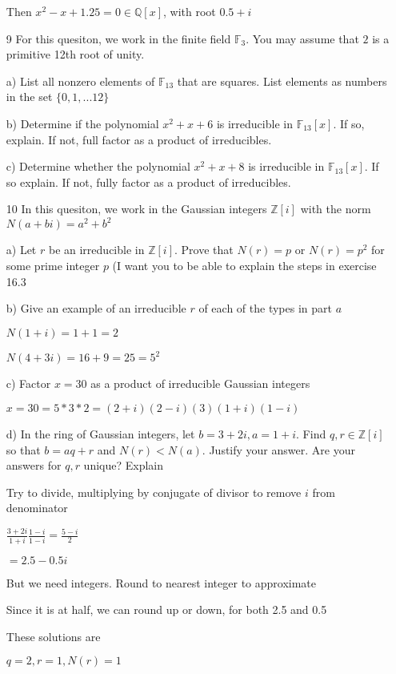 \documentclass[12pt]{article}
\begin{document}
\begin{itemize}
		Then $x^2 - x + 1.25 = 0 \in \mathbb{Q}[x]$, with root $0.5 + i$ 

	\item[9] For this quesiton, we work in the finite field $\mathbb{F}_{3}$. You may assume that $2$ is a primitive 12th root of unity.

		a) List all nonzero elements of $\mathbb{F}_{13}$ that are squares. List elements as numbers in the set $\{0,1,...12\}$

		b) Determine if the polynomial $x^2 + x + 6$ is irreducible in $\mathbb{F}_{13}[x]$. If so, explain. If not, full factor as a product of irreducibles.

		c) Determine whether the polynomial $x^2 + x + 8$ is irreducible in $\mathbb{F}_{13}[x]$. If so explain. If not, fully factor as a product of irreducibles.

	\item[10] In this quesiton, we work in the Gaussian integers $\mathbb{Z}[i]$  with the norm $N(a+bi) = a^2 + b^2$

		a) Let $r$ be an irreducible in $\mathbb{Z}[i]$. Prove that $N(r) = p$ or $N(r) = p^2$ for some prime integer $p$ (I want you to be able to explain the steps in exercise 16.3

		b) Give an example of an irreducible $r$ of each of the types in part $a$

		$N(1+i) = 1 + 1 = 2$

		$N(4 + 3i) = 16 + 9 = 25 = 5^2$

		c) Factor $x = 30$ as a product of irreducible Gaussian integers

		$x = 30 = 5 * 3 * 2 = (2 + i)(2-i)(3)(1+i)(1-i)$

		d) In the ring of Gaussian integers, let $b = 3 + 2i, a = 1+ i$. Find $q,r \in \mathbb{Z}[i]$ so that $b = aq + r$ and $N(r) < N(a)$. Justify your answer. Are your answers for $q,r$ unique? Explain

		Try to divide, multiplying by conjugate of divisor to remove $i$ from denominator

		$\frac{3+2i}{1+i} \frac{1-i}{1-i} = \frac{5-i}{2}$

		$ = 2.5 - 0.5i$

		But we need integers. Round to nearest integer to approximate

		Since it is at half, we can round up or down, for both 2.5 and 0.5

		These solutions are 
		
		$q = 2, r = 1, N(r) = 1$
		

\end{itemize}
\end{document}
